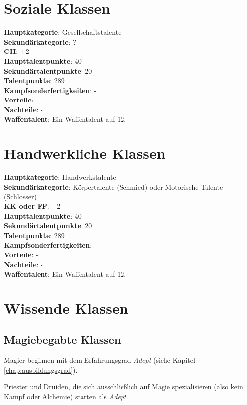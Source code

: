 \section{Soziale Klassen}
\textbf{Hauptkategorie}: Gesellschaftstalente \\
\textbf{Sekundärkategorie}: ? \\
\textbf{CH}: +2 \\
\textbf{Haupttalentpunkte}: 40 \\
\textbf{Sekundärtalentpunkte}: 20 \\
\textbf{Talentpunkte}: 289 \\
\textbf{Kampfsonderfertigkeiten}: - \\
\textbf{Vorteile}: - \\
\textbf{Nachteile}: - \\
\textbf{Waffentalent}: Ein Waffentalent auf 12.

\section{Handwerkliche Klassen}
\textbf{Hauptkategorie}: Handwerkstalente \\
\textbf{Sekundärkategorie}: Körpertalente (Schmied) oder Motorische Talente (Schlosser) \\
\textbf{KK oder FF}: +2 \\
\textbf{Haupttalentpunkte}: 40 \\
\textbf{Sekundärtalentpunkte}: 20 \\
\textbf{Talentpunkte}: 289 \\
\textbf{Kampfsonderfertigkeiten}: - \\
\textbf{Vorteile}: - \\
\textbf{Nachteile}: - \\
\textbf{Waffentalent}: Ein Waffentalent auf 12.

\section{Wissende Klassen}
\subsection{Magiebegabte Klassen}
\label{chap:magiebegabte_klassen}
Magier beginnen mit dem Erfahrungsgrad \textit{Adept} (siehe Kapitel \ref{chap:ausbildungsgrad}). 

Priester und Druiden, die sich ausschließlich auf Magie spezialisieren (also kein Kampf oder Alchemie) starten als \textit{Adept}.

